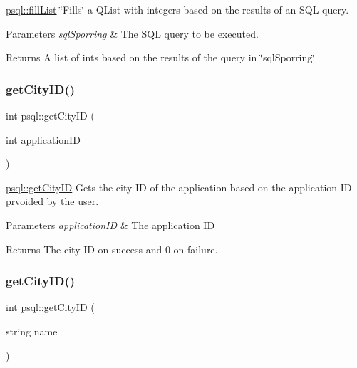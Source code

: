 \hyperlink{classpsql_a2ad41caea89dc5af0b55b12f6394fbf5}{psql\+::fill\+List} \char`\"{}\+Fills\char`\"{} a Q\+List with integers based on the results of an S\+QL query. 


\begin{DoxyParams}{Parameters}
{\em sql\+Sporring} & The S\+QL query to be executed. \\
\hline
\end{DoxyParams}
\begin{DoxyReturn}{Returns}
A list of ints based on the results of the query in \char`\"{}sql\+Sporring\char`\"{} 
\end{DoxyReturn}
\mbox{\label{classpsql_af3462a12dc106e0ca8df4fa8fcf28436}} 
\subsubsection{\texorpdfstring{get\+City\+I\+D()}{getCityID()}\hspace{0.1cm}{\footnotesize\ttfamily [1/2]}}
{\footnotesize\ttfamily int psql\+::get\+City\+ID (\begin{DoxyParamCaption}\item[{int}]{application\+ID }\end{DoxyParamCaption})}



\hyperlink{classpsql_af3462a12dc106e0ca8df4fa8fcf28436}{psql\+::get\+City\+ID} Gets the city ID of the application based on the application ID prvoided by the user. 


\begin{DoxyParams}{Parameters}
{\em application\+ID} & The application ID \\
\hline
\end{DoxyParams}
\begin{DoxyReturn}{Returns}
The city ID on success and 0 on failure. 
\end{DoxyReturn}
\mbox{\label{classpsql_a0c33b3f48064ba75abaa4b0b58eb1ccd}} 
\subsubsection{\texorpdfstring{get\+City\+I\+D()}{getCityID()}\hspace{0.1cm}{\footnotesize\ttfamily [2/2]}}
{\footnotesize\ttfamily int psql\+::get\+City\+ID (\begin{DoxyParamCaption}\item[{string}]{name }\end{DoxyParamCaption})}




